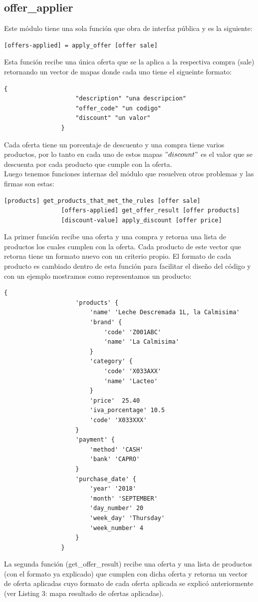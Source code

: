 \documentclass[a4paper, 12pt]{article}
\begin{document}
		\subsection{offer\_applier}
			Este módulo tiene una sola función que obra de interfaz pública y es la siguiente:
			\begin{lstlisting}[frame=tb, caption=firmas de la interfaz pública, label=zebra, tabsize=1]
				[offers-applied] = apply_offer [offer sale]
			\end{lstlisting}
			Esta función recibe una única oferta que se la aplica a la respectiva compra (sale) retornando un vector de mapas donde 				cada uno tiene el sigueinte formato:
			\begin{lstlisting}[frame=tb, caption=mapa resultado de ofertas aplicadas, label=zebra, tabsize=1]
				{
					"description" "una descripcion"
					"offer_code" "un codigo"
					"discount" "un valor"
				}
			\end{lstlisting}
			Cada oferta tiene un porcentaje de descuento y una compra tiene varios productos, por lo tanto en cada uno de estos 				mapas $"discount"$ es el valor que se descuenta por cada producto que cumple con la oferta.\\
			Luego tenemos funciones internas del módulo que resuelven otros problemas y las firmas son estas:
			\begin{lstlisting}[frame=tb, caption=firmas de las funciones privadas, label=zebra, tabsize=1]
				[products] get_products_that_met_the_rules [offer sale]
				[offers-applied] get_offer_result [offer products]
				[discount-value] apply_discount [offer price]
			\end{lstlisting}
			La primer función recibe una oferta y una compra y retorna una lista de productos los cuales cumplen con la oferta.
			Cada producto de este vector que retorna tiene un formato nuevo con un criterio propio. El formato de cada producto es 				cambiado dentro de esta función para facilitar el diseño del código y con un ejemplo mostramos como representamos un 				producto:
			\begin{lstlisting}[frame=tb, caption=formato de un producto, label=zebra, tabsize=1]
				{
					'products' {
						'name' 'Leche Descremada 1L, la Calmisima'
						'brand' {
							'code' 'Z001ABC'
							'name' 'La Calmisima'
						}
						'category' {
							'code' 'X033AXX'
							'name' 'Lacteo'
						}
						'price'  25.40
						'iva_porcentage' 10.5
						'code' 'X033XXX'
					}
					'payment' {
						'method' 'CASH'
						'bank' 'CAPRO'
					}
					'purchase_date' {
						'year' '2018'
						'month' 'SEPTEMBER'
						'day_number' 20
						'week_day' 'Thursday'
						'week_number' 4
					}
				}
			\end{lstlisting}
			La segunda función (get\_offer\_result) recibe una oferta y una lista de productos (con el formato ya explicado) que 				cumplen con dicha oferta y retorna un vector de oferta aplicadas cuyo formato de cada oferta aplicada se explicó 				anteriormente (ver Listing 3: mapa resultado de ofertas aplicadas).
\end{document}
